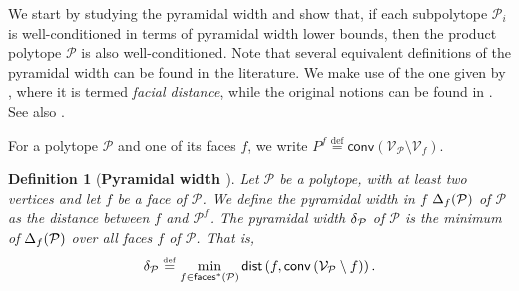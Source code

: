 \documentclass[twoside]{article}
\newcommand\linktoproof[1]{{\normalfont[{\hyperlink{proof:#1}{$\downarrow$}}]}}
\newcommand{\mP}{\mathcal{P}}
\newcommand{\mQ}{\mathcal{Q}}
\newcommand{\verts}[1]{\mathcal{V}_{#1}}
\newcommand{\conv}[1]{\mathsf{conv}\left(#1\right)}
\newcommand{\faces}[1]{{\mathsf{faces}^\ast}\left(#1\right)}
\newcommand{\dist}[1]{\mathsf{dist}\left(#1\right)}
\newcommand{\defi}{\stackrel{\mathrm{\scriptscriptstyle def}}{=}}
\newtheorem{lemma}[theorem]{Lemma}
\newtheorem{definition}[theorem]{Definition}
\begin{document}
We start by studying the pyramidal width and show that, if each subpolytope $\mP_i$ is well-conditioned in terms of pyramidal width lower bounds, then the product polytope $\mP$ is also well-conditioned.
Note that several equivalent definitions of the pyramidal width can be found in the literature. We make use of the one given by \citep{PR18}, 
where it is termed \emph{facial distance}, while the original notions can be found in \citep{lacoste2013affine}. See also \citep{BS15, LJ15}. 


For a polytope $\mathcal{P}$ and one of its faces $f$, we write $P^f\defi\conv{\verts{\mP}\setminus \verts{f}}$. 

\begin{definition}[\textbf{Pyramidal width \citep{PR18}}]\label{def:pyrwidth}
Let $\mP$ be a polytope, with at least two vertices and let $f$ be a face of $\mP$. We define the \emph{pyramidal width in $f$} $\wface{f}{\mP}$ of $\mP$ as the distance between $f$ and $\mP^f$. The \emph{pyramidal width} $\w{\mP}$ of $\mP$ is the minimum of $\wface{f}{\mP}$ over all faces $f$ of $\mP$. That is,
\begin{equation}\label{eq:pyrwidth_X}
\pw{\mP} \defi \min_{f \in \faces{\mP}} \dist{f, \conv{\verts{\mP} \setminus f}}.
    \vspace{0.3cm}
\end{equation}
\end{definition}
\end{document}
